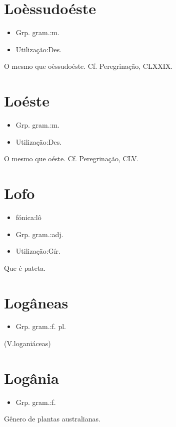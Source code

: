 \section{Loèssudoéste}
\begin{itemize}
\item {Grp. gram.:m.}
\end{itemize}
\begin{itemize}
\item {Utilização:Des.}
\end{itemize}
O mesmo que \textunderscore oèssudoéste\textunderscore . Cf. \textunderscore Peregrinação\textunderscore , CLXXIX.
\section{Loéste}
\begin{itemize}
\item {Grp. gram.:m.}
\end{itemize}
\begin{itemize}
\item {Utilização:Des.}
\end{itemize}
O mesmo que \textunderscore oéste\textunderscore . Cf. \textunderscore Peregrinação\textunderscore , CLV.
\section{Lofo}
\begin{itemize}
\item {fónica:lô}
\end{itemize}
\begin{itemize}
\item {Grp. gram.:adj.}
\end{itemize}
\begin{itemize}
\item {Utilização:Gír.}
\end{itemize}
Que é pateta.
\section{Logâneas}
\begin{itemize}
\item {Grp. gram.:f. pl.}
\end{itemize}
(V.loganiáceas)
\section{Logânia}
\begin{itemize}
\item {Grp. gram.:f.}
\end{itemize}
Gênero de plantas australianas.
